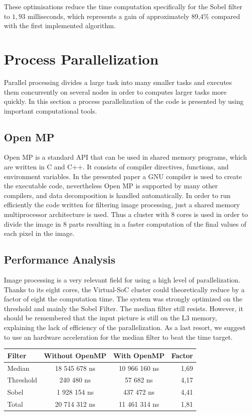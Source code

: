 \documentclass[journal]{IEEEtran}
\begin{document}
These optimisations reduce the time computation specifically for the Sobel filter to \(1,93\) milliseconds, which represents a gain of approximately 89,4\% compared with the first implemented algorithm.

\section{Process Parallelization}

Parallel processing divides a large task into many smaller tasks and executes them concurrently on several nodes in order to computes larger tasks more quickly. In this section a process parallelization of the code is presented by using important computational tools.

\subsection{Open MP}
Open MP is a standard API that can be used in shared memory programs, which are written in C and C++. It consists of compiler directives, functions, and environment variables. In the presented paper a GNU compiler is used to create the executable code, nevertheless Open MP is supported by many other compilers, and data decomposition is handled automatically. In order to run efficiently the code written for filtering image processing, just a shared memory multiprocessor architecture is used. Thus a cluster with 8 cores is used in order to divide the image in 8 parts resulting in a faster computation of the final values of each pixel in the image.

\subsection{Performance Analysis}
Image processing is a very relevant field for using a high level of parallelization. Thanks to its eight cores, the Virtual-SoC cluster could theoretically reduce by a factor of eight the computation time. The system was strongly optimized on the threshold and mainly the Sobel Filter. The median filter still resists. However, it should be remembered that the input picture is still on the L3 memory, explaining the lack of efficiency of the parallelization. As a last resort, we suggest to use an hardware acceleration for the median filter to beat the time target.\\


\begin{tabular}[!h]{|l|c|c|r|}
  \hline
  Filter & Without OpenMP & With OpenMP & Factor \\
  \hline
  Median & 18 545 678 ns & 10 966 160 ns & 1,69 \\
  \hline
  Threshold & 240 480 ns & 57 682 ns & 4,17\\
  \hline
  Sobel & 1 928 154 ns & 437 472 ns & 4,41\\
  \hline
  Total & 20 714 312 ns & 11 461 314 ns & 1,81\\
  \hline
\end{tabular}
\end{document}
